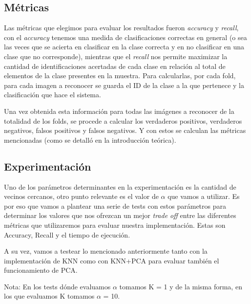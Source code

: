 \subsection*{Métricas}

\par Las métricas que elegimos para evaluar los resultados fueron \textit{accuracy} y \textit{recall}, con el \textit{accuracy} tenemos una medida de clasificaciones correctas en general (o sea las veces que se acierta en clasificar en la clase correcta y en no clasificar en una clase que no corresponde), mientras que el \textit{recall} nos permite maximizar la cantidad de identificaciones acertadas de cada clase en relación al total de elementos de la clase presentes en la muestra.
Para calcularlas, por cada fold, para cada imagen a reconocer se guarda el ID de la clase a la que pertenece y la clasificación que hace el sistema.
\par Una vez obtenida esta información para todas las imágenes a reconocer de la totalidad de los folds, se procede a calcular los verdaderos positivos, verdaderos negativos, falsos positivos y falsos negativos. Y con estos se calculan las métricas mencionadas (como se detalló en la introducción teórica).

\subsection*{Experimentación}

\par Uno de los parámetros determinantes en la experimentación es la cantidad de vecinos cercanos, otro punto relevante es el valor de $\alpha$ que vamos a utilizar. Es por eso que vamos a plantear una serie de tests con estos parámetros para determinar los valores que nos ofrezcan un mejor \textit{trade off} entre las diferentes métricas que utilizaremos para evaluar nuestra implementación.\newline
Estas son Accuracy, Recall y el tiempo de ejecución.

A su vez, vamos a testear lo mencionado anteriormente tanto con la implementación de KNN como con KNN+PCA para evaluar también el funcionamiento de PCA. 

Nota: En los tests dónde evaluamos $\alpha$ tomamos K = 1 y de la misma forma, en los que evaluamos K tomamos $\alpha$ = 10. 

